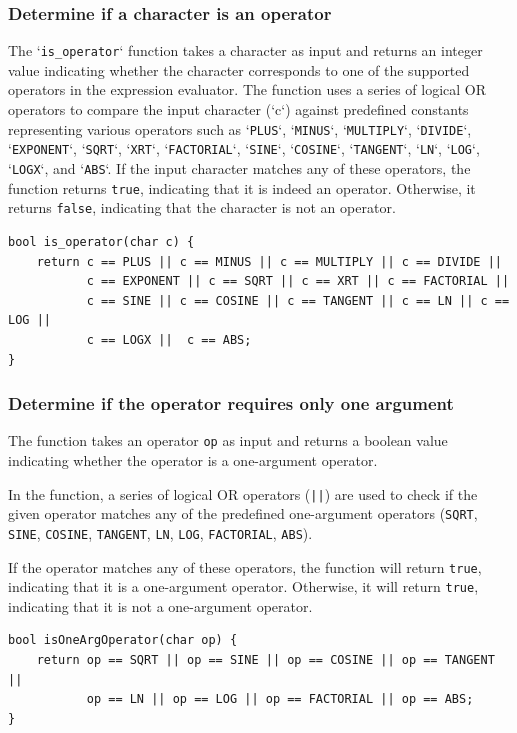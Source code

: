 \documentclass[a4paper, twoside]{report}
\begin{document}
\subsubsection{Determine if a character is an operator}
The `\texttt{is\_operator}` function takes a character as input and returns an integer value indicating whether the character corresponds to one of the supported operators in the expression evaluator. The function uses a series of logical OR operators to compare the input character (`c`) against predefined constants representing various operators such as `\texttt{PLUS}`, `\texttt{MINUS}`, `\texttt{MULTIPLY}`, `\texttt{DIVIDE}`, `\texttt{EXPONENT}`, `\texttt{SQRT}`, `\texttt{XRT}`, `\texttt{FACTORIAL}`, `\texttt{SINE}`, `\texttt{COSINE}`, `\texttt{TANGENT}`, `\texttt{LN}`, `\texttt{LOG}`, `\texttt{LOGX}`, and `\texttt{ABS}`. If the input character matches any of these operators, the function returns \texttt{true}, indicating that it is indeed an operator. Otherwise, it returns \texttt{false}, indicating that the character is not an operator.
\begin{verbatim}
bool is_operator(char c) {
    return c == PLUS || c == MINUS || c == MULTIPLY || c == DIVIDE ||
           c == EXPONENT || c == SQRT || c == XRT || c == FACTORIAL ||
           c == SINE || c == COSINE || c == TANGENT || c == LN || c == LOG ||
           c == LOGX ||  c == ABS;
}
\end{verbatim}

\subsubsection{Determine if the operator requires only one argument}

The function takes an operator \texttt{op} as input and returns a boolean value indicating whether the operator is a one-argument operator.

In the function, a series of logical OR operators (\texttt{||}) are used to check if the given operator matches any of the predefined one-argument operators (\texttt{SQRT}, \texttt{SINE}, \texttt{COSINE}, \texttt{TANGENT}, \texttt{LN}, \texttt{LOG}, \texttt{FACTORIAL}, \texttt{ABS}). 

If the operator matches any of these operators, the function will return \texttt{true}, indicating that it is a one-argument operator. Otherwise, it will return \texttt{true}, indicating that it is not a one-argument operator.

\begin{verbatim}
bool isOneArgOperator(char op) {
	return op == SQRT || op == SINE || op == COSINE || op == TANGENT ||
	       op == LN || op == LOG || op == FACTORIAL || op == ABS;
}
\end{verbatim}
\end{document}
